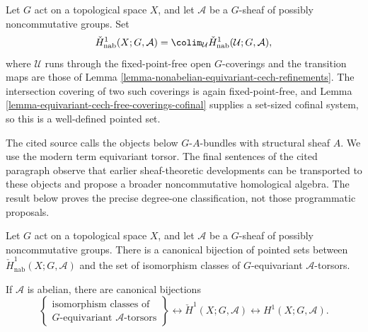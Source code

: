 \begin{definition}
\label{definition-nonabelian-equivariant-cech-h1}
Let $G$ act on a topological space $X$, and let $\mathcal A$ be a
$G$-sheaf of possibly noncommutative groups. Set
$$
\check H^1_{\mathrm{nab}}(X;G,\mathcal A)=
\colim_{\mathcal U}
\check H^1_{\mathrm{nab}}(\mathcal U;G,\mathcal A),
$$
where $\mathcal U$ runs through the fixed-point-free open
$G$-coverings and the transition maps are those of Lemma
\ref{lemma-nonabelian-equivariant-cech-refinements}. The intersection
covering of two such coverings is again fixed-point-free, and Lemma
\ref{lemma-equivariant-cech-free-coverings-cofinal} supplies a set-sized
cofinal system, so this is a well-defined pointed set.
\end{definition}

\begin{lemma}
\label{lemma-nonabelian-equivariant-cech-h1-torsors}
\begin{reference}
\cite[Chapter V, \S 5.5, Remarks II, p. 213]{Tohoku}
\end{reference}
\begin{history}
The cited source calls the objects below $G$-$A$-bundles with structural
sheaf $A$. We use the modern term equivariant torsor. The final sentences
of the cited paragraph observe that earlier sheaf-theoretic developments
can be transported to these objects and propose a broader noncommutative
homological algebra. The result below proves the precise degree-one
classification, not those programmatic proposals.
\end{history}
Let $G$ act on a topological space $X$, and let $\mathcal A$ be a
$G$-sheaf of possibly noncommutative groups. There is a canonical
bijection of pointed sets between
$\check H^1_{\mathrm{nab}}(X;G,\mathcal A)$ and the set of isomorphism
classes of $G$-equivariant $\mathcal A$-torsors.

If $\mathcal A$ is abelian, there are canonical bijections
$$
\left\{
\begin{matrix}
\text{isomorphism classes of} \\
G\text{-equivariant }\mathcal A\text{-torsors}
\end{matrix}
\right\}
\longleftrightarrow
\check H^1(X;G,\mathcal A)
\longleftrightarrow
H^1(X;G,\mathcal A).
$$
\end{lemma}


